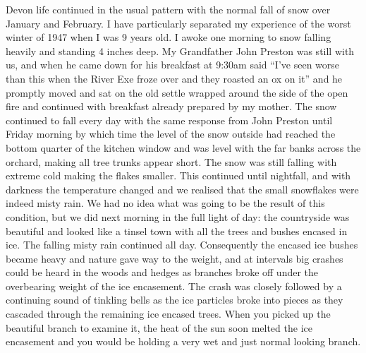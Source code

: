 Devon life continued in the usual pattern with the normal fall of snow over
January and February. I have particularly separated my experience of the worst
winter of 1947 when I was 9 years old. I awoke one morning to snow falling
heavily and standing 4 inches deep. My Grandfather John Preston was still with
us, and when he came down for his breakfast at 9:30am said ``I've seen worse
than this when the River Exe froze over and they roasted an ox on it'' and he
promptly moved and sat on the old settle wrapped around the side of the open
fire and continued with breakfast already prepared by my mother. The snow
continued to fall every day with the same response from John Preston until
Friday morning by which time the level of the snow outside had reached the
bottom quarter of the kitchen window and was level with the far banks across
the orchard, making all tree trunks appear short. The snow was still falling
with extreme cold making the flakes smaller. This continued until nightfall,
and with darkness the temperature changed and we realised that the small
snowflakes were indeed misty rain. We had no idea what was going to be the
result of this condition, but we did next morning in the full light of day: the
countryside was beautiful and looked like a tinsel town with all the trees and
bushes encased in ice. The falling misty rain continued all day. Consequently
the encased ice bushes became heavy and nature gave way to the weight, and at
intervals big crashes could be heard in the woods and hedges as branches broke
off under the overbearing weight of the ice encasement. The crash was closely
followed by a continuing sound of tinkling bells as the ice particles broke
into pieces as they cascaded through the remaining ice encased trees. When you
picked up the beautiful branch to examine it, the heat of the sun soon melted
the ice encasement and you would be holding a very wet and just normal looking
branch.

